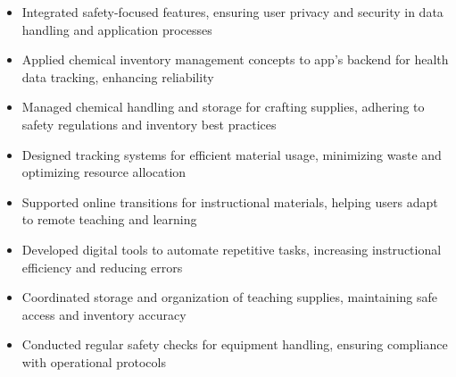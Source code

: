 \par\smallskip
\noindent
\begin{minipage}{20cm}
  \begin{minipage}{9.75cm}
    \begin{itemize}
      \item Integrated safety-focused features, ensuring user privacy and security in data handling and application processes
      \item Applied chemical inventory management concepts to app’s backend for health data tracking, enhancing reliability
    \end{itemize}
  \end{minipage}
  \hfill
  \begin{minipage}{9.75cm}
    \begin{itemize}
      \item Managed chemical handling and storage for crafting supplies, adhering to safety regulations and inventory best practices
      \item Designed tracking systems for efficient material usage, minimizing waste and optimizing resource allocation
    \end{itemize}
  \end{minipage}
\end{minipage}
\par\smallskip
\divider

\par\smallskip
\noindent
\begin{minipage}{20cm}
  \begin{minipage}{9.75cm}
    \begin{itemize}
      \item Supported online transitions for instructional materials, helping users adapt to remote teaching and learning
      \item Developed digital tools to automate repetitive tasks, increasing instructional efficiency and reducing errors
    \end{itemize}
  \end{minipage}
  \hfill
  \begin{minipage}{9.75cm}
    \begin{itemize}
      \item Coordinated storage and organization of teaching supplies, maintaining safe access and inventory accuracy
      \item Conducted regular safety checks for equipment handling, ensuring compliance with operational protocols
    \end{itemize}
  \end{minipage}
\end{minipage}

